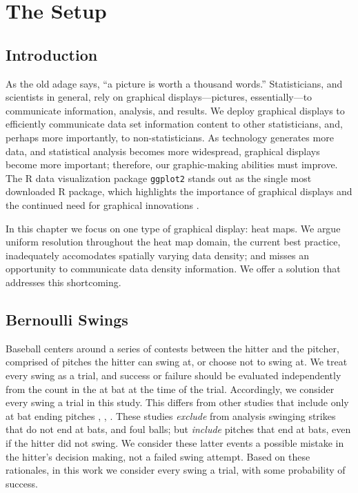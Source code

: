 \section{The Setup}
\subsection{Introduction}

As the old adage says, ``a picture is worth a thousand words.'' Statisticians, and scientists in general, rely on graphical displays---pictures, essentially---to communicate information, analysis, and results. We deploy graphical displays to efficiently communicate data set information content to other statisticians, and, perhaps more importantly, to non-statisticians. As technology generates more data, and statistical analysis becomes more widespread, graphical displays become more important; therefore, our graphic-making abilities must improve. The R data visualization package \verb|ggplot2| stands out as the single most downloaded R package, which highlights the importance of graphical displays and the continued need for graphical innovations \citep{rdoc}.

In this chapter we focus on one type of graphical display: heat maps. We argue uniform resolution throughout the heat map domain, the current best practice, inadequately accomodates spatially varying data density; and misses an opportunity to communicate data density information. We offer a solution that addresses this shortcoming.

\subsection{Bernoulli Swings}


Baseball centers around a series of contests between the hitter and the pitcher, comprised of pitches the hitter can swing at, or choose not to swing at. We treat every swing as a trial, and success or failure should be evaluated independently from the count in the at bat at the time of the trial. Accordingly, we consider every swing a trial in this study.  This differs from other studies that include only at bat ending pitches \citep{Cross2015}, \citep{Baumer2010}, \citep{Fast2011}. These studies {\it exclude} from analysis swinging strikes that do not end at bats, and foul balls; but {\it include} pitches that end at bats, even if the hitter did not swing. We consider these latter events a possible mistake in the hitter's decision making, not a failed swing attempt. Based on these rationales, in this work we consider every swing a trial, with some probability of success. 

